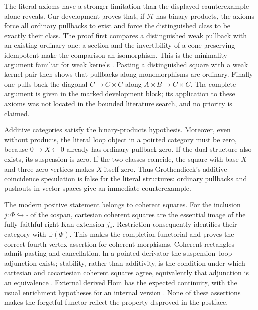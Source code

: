 The literal axioms have a stronger limitation than the displayed counterexample alone reveals. Our development proves that, if $\mathcal H$ has binary products, the axioms force all ordinary pullbacks to exist and force the distinguished class to be exactly their class. The proof first compares a distinguished weak pullback with an existing ordinary one: a section and the invertibility of a cone-preserving idempotent make the comparison an isomorphism. This is the minimality argument familiar for weak kernels \citep[\S1, p.~6 of the 2014 manuscript]{Krause2016FlatCovers}. Pasting a distinguished square with a weak kernel pair then shows that pullbacks along monomorphisms are ordinary. Finally one pulls back the diagonal $C\to C\times C$ along $A\times B\to C\times C$. The complete argument is given in the marked development block; its application to these axioms was not located in the bounded literature search, and no priority is claimed.

Additive categories satisfy the binary-products hypothesis. Moreover, even without products, the literal loop object in a pointed category must be zero, because $0\to X\leftarrow0$ already has ordinary pullback zero. If the dual structure also exists, its suspension is zero. If the two classes coincide, the square with base $X$ and three zero vertices makes $X$ itself zero. Thus Grothendieck's additive coincidence speculation is false for the literal structures: ordinary pullbacks and pushouts in vector spaces give an immediate counterexample.

The modern positive statement belongs to coherent squares. For the inclusion $j:\Phi\hookrightarrow\square$ of the cospan, cartesian coherent squares are the essential image of the fully faithful right Kan extension $j_*$. Restriction consequently identifies their category with $\mathbb D(\Phi)$. This makes the completion functorial and proves the correct fourth-vertex assertion for coherent morphisms. Coherent rectangles admit pasting and cancellation. In a pointed derivator the suspension--loop adjunction exists; stability, rather than additivity, is the condition under which cartesian and cocartesian coherent squares agree, equivalently that adjunction is an equivalence \citetext{\citealp[Proposition~3.17]{Groth2013}; \citealp[Theorem~7.1, arXiv v2]{GrothPontoShulman2014}}. External derived Hom has the expected continuity, with the usual enrichment hypotheses for an internal version \citep[Proposition~6.13]{Cisinski2003}. None of these assertions makes the forgetful functor reflect the property disproved in the postface.

